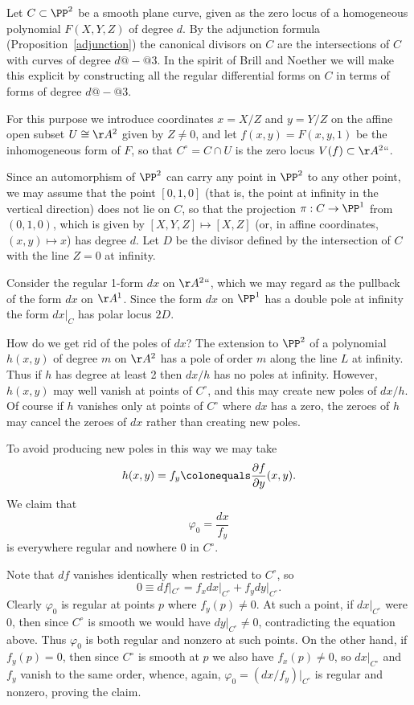 Let $C \subset \PP^2$  be a smooth plane curve, given as the zero locus of a homogeneous polynomial $F(X,Y,Z)$ of degree $d$. By the
adjunction formula
%
(Proposition~\ref{adjunction}) the canonical  divisors on $C$
are the intersections of $C$ with curves of degree $d@{-}@3$. In the spirit of Brill and Noether we
will make this explicit by constructing all
 the
regular differential forms
%
%
 on $C$ in terms of forms of degree $d@{-}@3$.

For this purpose we introduce coordinates $x = X/Z$ and $y = Y/Z$ on the affine open subset $U \cong \AA^2$ given by $Z \neq 0$, and let $f(x,y) = F(x, y,1)$ be the inhomogeneous form of $F$, so that $C^\circ = C \cap U$ is the zero locus $V(f) \subset  \AA^2` `$.

Since an automorphism of $\PP^2$ can carry any point in $\PP^{2}$ to any other point, we may assume
that
the point $[0,1,0]$ (that is, the point at infinity
in the vertical direction) does not lie on $C$, so that the
 projection  $\pi: C \to \PP^1$ from $(0,1,0)$, which is given by $[X,Y,Z] \mapsto [X,Z]$ (or, in affine coordinates, $(x,y) \mapsto x$)  has degree $d$. Let $D$ be the divisor defined by the intersection of $C$ with the line $Z=0$ at infinity.

Consider the
regular 1-form $dx$ on $\AA^2` `$, which we may regard as the pullback of the form $dx$ on
 $\AA^{1}$.
Since the form $dx$ on $\PP^{1}$ has a
%
double pole
at infinity the form $dx|_{C}$ has polar
locus $2D$.

 \def\Co{{C^{\circ}}}
How do we get rid of the poles of $dx$? The extension to $\PP^2$ of a polynomial $h(x,y)$ of degree $m$ on
$\AA^2$ has a pole of order $m$ along the line $L$ at infinity. Thus if $h$ has degree at least 2 then $dx/h$ has no poles at infinity. However, $h(x,y)$ may well vanish at points of $\Co$, and this may create new poles of $dx/h$. Of course if $h$ vanishes only at  points of $\Co$ where $dx$ has a zero, the zeroes of $h$ may cancel the zeroes of $dx$ rather than creating new poles.

 To avoid producing new poles in this way we may take
 $$
 h(x,y) = f_{y} \colonequals \frac{\partial f}{\partial y}(x,y).
 $$
 We claim that
 $$
\varphi_0 = \frac{dx}{f_{y}}
$$
is everywhere regular and nowhere 0 in $C^\circ$.

Note that $df$ vanishes identically when restricted to $C^\circ$, so
 $$
 0 \equiv df|_{\Co} = f_{x}dx|_{\Co} + f_{y}dy|_{\Co} .
 $$
Clearly $\varphi_0$ is regular at points $p$ where
$f_{y}(p) \neq 0$. At such a point, if $dx|_{\Co}$ were 0, then since
$\Co$ is smooth we would have $dy|_{\Co} \neq 0$, contradicting the
equation above. Thus $\varphi_{0}$ is both regular and nonzero at such
points. On the other hand, if $f_{y}(p) = 0$, then since $\Co$ is
smooth at $p$
we also have $f_{x}(p)\ne0$,
so $dx|_{\Co}$ and $f_{y}$ vanish to the same
order, whence, again, $\varphi_0 = (dx/f_{y})|_{\Co}$ is regular and nonzero, proving the claim.

